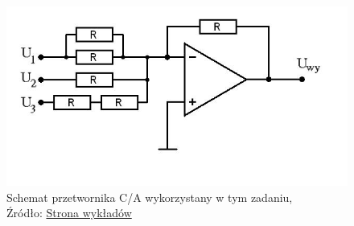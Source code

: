 \documentclass{article}
\begin{document}
      \begin{figure}[!ht]
        \centering
        \includegraphics[scale=0.45]{grafiki/6.2_schemat.jpg}
        \caption{Schemat przetwornika C/A wykorzystany w tym zadaniu,
        \\Źródło: \href{https://spe.if.uj.edu.pl/instrukcje}{Strona wykładów}}
      \end{figure}
\end{document}
